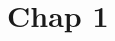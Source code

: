 \documentclass[a4paper, 12pt, french, twoside]{article}
\begin{document}





\section{Chap 1}
\end{document}

